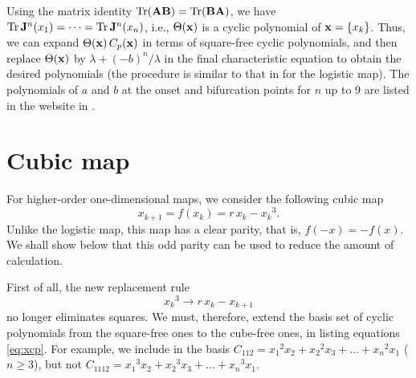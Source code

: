 \documentclass{ws-ijbc}
\begin{document}
Using the matrix identity $\mathrm{Tr}( \mathbf{A} \mathbf{B}) = \mathrm{Tr}(\mathbf{B} \mathbf{A})$,
  we have
    $\mathrm{Tr} \, \mathbf{J}^n(x_1) = \cdots = \mathrm{Tr} \, \mathbf{J}^n(x_n)$,
i.e., $\Theta(\mathbf{x})$ is a cyclic polynomial of $\mathbf{x} = \{ x_k \}$.
%
Thus, we can expand $\Theta(\mathbf{x}) \, C_p(\mathbf{x})$
  in terms of square-free cyclic polynomials,
  and then replace $\Theta(\mathbf{x})$ by $\lambda + (-b)^n/\lambda$
  in the final characteristic equation to obtain the desired polynomials
  (the procedure is similar to that in  for the logistic map).
%
%
%
The polynomials of $a$ and $b$
  at the onset and bifurcation points for $n$ up to 9
  are listed in the website in .





\section{\label{sec:cubic}Cubic map}


For higher-order one-dimensional maps, we consider the following cubic map \cite{strogatz}
%
\begin{equation}
  x_{k + 1} = f(x_k) = r \, x_k - {x_k}^3.
\label{eq:cubic}
\end{equation}
%
Unlike the logistic map, this map has a clear parity,
  that is, $f(-x) = -f(x)$.
We shall show below that this odd parity can be used to reduce the amount of calculation.

First of all, the new replacement rule
\begin{equation}
  {x_k}^3 \rightarrow r \, x_k - x_{k+1}
\label{eq:cubreplace}
\end{equation}
no longer eliminates squares.
%
We must, therefore, extend the basis set of cyclic polynomials
  from the square-free ones to the cube-free ones,
  in listing equations \eqref{eq:xcp}.
For example, we include in the basis
  $C_{112} = {x_1}^2 x_2 + {x_2}^2 x_3 + \dots + {x_n}^2 x_1$ ($n\ge3$),
but not
  $C_{1112} = {x_1}^3 x_2 + {x_2}^3 x_3 + \dots + {x_n}^3 x_1$.
\end{document}
